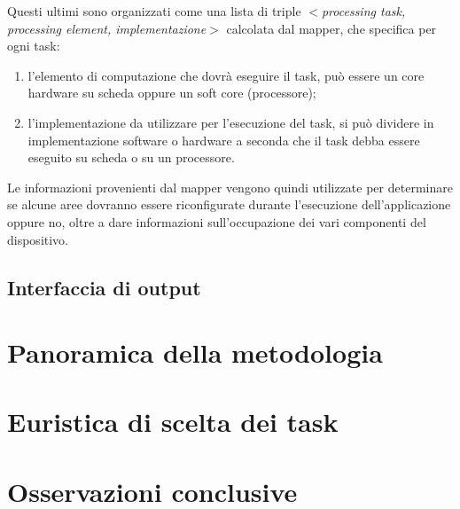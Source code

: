 Questi ultimi sono organizzati come una lista di triple \emph{$<$processing 
task, processing element, implementazione$>$} calcolata dal mapper, che 
specifica per ogni task:
\begin{enumerate}
 \item l'elemento di computazione che dovrà eseguire il task, può essere un 
core hardware su scheda oppure un soft core (processore);
 \item l'implementazione da utilizzare per l'esecuzione del task, si può 
dividere in implementazione software o hardware a seconda che il task debba 
essere eseguito su scheda o su un processore.
\end{enumerate}
Le informazioni provenienti dal mapper vengono quindi utilizzate per 
determinare se alcune aree dovranno essere riconfigurate durante l'esecuzione 
dell'applicazione oppure no, oltre a dare informazioni sull'occupazione dei 
vari componenti del dispositivo.


\subsection{Interfaccia di output}




\section{Panoramica della metodologia}
\label{sec:panoramicaMetodologia}


\section{Euristica di scelta dei task}
\label{sec:euristicaSceltaTask}


\section{Osservazioni conclusive}
\label{sec:osservazioniConclusive}
